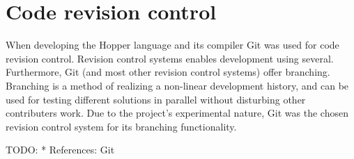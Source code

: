 \section{Code revision control}

When developing the Hopper language and its compiler Git was used for code revision control.
Revision control systems enables development using several. Furthermore, Git (and most other
revision control systems) offer branching. Branching is a method of realizing a non-linear
development history, and can be used for testing different solutions in parallel without
disturbing other contributers work. Due to the project's experimental nature, Git was the
chosen revision control system for its branching functionality.

TODO:
* References: Git
